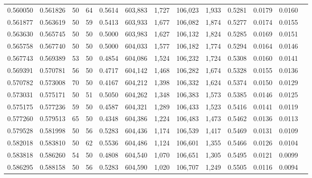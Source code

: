 \begin{tabular}{rrrrrrrrrrrrr}
0.560050 & 0.561826 &    50 &  64 &                                     0.5614 & 603,883 &   1,727 & 106,023 &   1,933 & 0.5281 & 0.0179 & 0.0160 \\
0.561877 & 0.563619 &    50 &  59 &                                     0.5413 & 603,933 &   1,677 & 106,082 &   1,874 & 0.5277 & 0.0174 & 0.0155 \\
0.563630 & 0.565745 &    50 &  50 &                                     0.5000 & 603,983 &   1,627 & 106,132 &   1,824 & 0.5285 & 0.0169 & 0.0151 \\
0.565758 & 0.567740 &    50 &  50 &                                     0.5000 & 604,033 &   1,577 & 106,182 &   1,774 & 0.5294 & 0.0164 & 0.0146 \\
0.567743 & 0.569389 &    53 &  50 &                                     0.4854 & 604,086 &   1,524 & 106,232 &   1,724 & 0.5308 & 0.0160 & 0.0141 \\
0.569391 & 0.570781 &    56 &  50 &                                     0.4717 & 604,142 &   1,468 & 106,282 &   1,674 & 0.5328 & 0.0155 & 0.0136 \\
0.570782 & 0.573008 &    70 &  50 &                                     0.4167 & 604,212 &   1,398 & 106,332 &   1,624 & 0.5374 & 0.0150 & 0.0129 \\
0.573031 & 0.575171 &    50 &  51 &                                     0.5050 & 604,262 &   1,348 & 106,383 &   1,573 & 0.5385 & 0.0146 & 0.0125 \\
0.575175 & 0.577236 &    59 &  50 &                                     0.4587 & 604,321 &   1,289 & 106,433 &   1,523 & 0.5416 & 0.0141 & 0.0119 \\
0.577260 & 0.579513 &    65 &  50 &                                     0.4348 & 604,386 &   1,224 & 106,483 &   1,473 & 0.5462 & 0.0136 & 0.0113 \\
0.579528 & 0.581998 &    50 &  56 &                                     0.5283 & 604,436 &   1,174 & 106,539 &   1,417 & 0.5469 & 0.0131 & 0.0109 \\
0.582018 & 0.583810 &    50 &  62 &                                     0.5536 & 604,486 &   1,124 & 106,601 &   1,355 & 0.5466 & 0.0126 & 0.0104 \\
0.583818 & 0.586260 &    54 &  50 &                                     0.4808 & 604,540 &   1,070 & 106,651 &   1,305 & 0.5495 & 0.0121 & 0.0099 \\
0.586295 & 0.588158 &    50 &  56 &                                     0.5283 & 604,590 &   1,020 & 106,707 &   1,249 & 0.5505 & 0.0116 & 0.0094 \\

\end{tabular}
